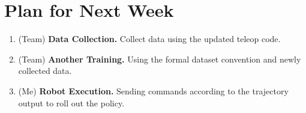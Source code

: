 \documentclass[11pt]{article}
\begin{document}
\section{Plan for Next Week}

\begin{enumerate}\label{sec:plan}
  \item (Team) \textbf{Data Collection. } Collect data using the updated teleop code.
  \item (Team) \textbf{Another Training.} Using the formal dataset convention and newly collected data. 
  \item (Me) \textbf{Robot Execution.} Sending commands according to the trajectory output to roll out the policy.
\end{enumerate}
\end{document}

